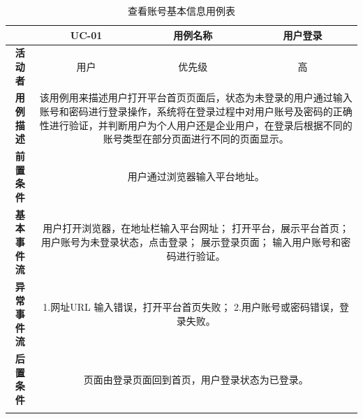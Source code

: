 \begin{longtable}[c]{c|ccc}
	\caption{查看账号基本信息用例表}
	\label{tab:tab5}\\
	\shline
	\multicolumn{1}{c|}{\textbf{用例编号}} & \multicolumn{1}{c|}{UC-01} & \multicolumn{1}{c|}{用例名称} &  用户登录\\ \hline
	\endhead
	\multicolumn{1}{c|}{\textbf{活动者}} & \multicolumn{1}{c|}{用户} & \multicolumn{1}{c|}{优先级} &高  \\ \hline
	\textbf{用例描述} & \multicolumn{3}{p{12cm}}{该用例用来描述用户打开平台首页页面后，状态为未登录的用户通过输入账号和密码进行登录操作，系统将在登录过程中对用户账号及密码的正确性进行验证，并判断用户为个人用户还是企业用户，在登录后根据不同的账号类型在部分页面进行不同的页面显示。} \\ \hline
	\textbf{前置条件}& \multicolumn{3}{p{12cm}}{用户通过浏览器输入平台地址。} \\ \hline
	\textbf{基本事件流}& \multicolumn{3}{p{12cm}}{用户打开浏览器，在地址栏输入平台网址；\newline
		打开平台，展示平台首页；\newline
		用户账号为未登录状态，点击登录；\newline
		展示登录页面；\newline
		输入用户账号和密码进行验证。} \\ \hline
	\textbf{异常事件流}& \multicolumn{3}{p{12cm}}{1.网址URL 输入错误，打开平台首页失败；\newline
		2.用户账号或密码错误，登录失败。
	} \\ \hline
	\textbf{后置条件}& \multicolumn{3}{p{12cm}}{页面由登录页面回到首页，用户登录状态为已登录。} \\ \shline
\end{longtable}

